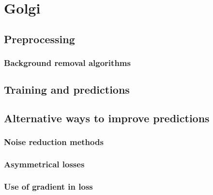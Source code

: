 \section{Golgi}
    \subsection{Preprocessing}
        
        \subsubsection{Background removal algorithms}
        
    \subsection{Training and predictions}
        
        

    \subsection{Alternative ways to improve predictions}
        \subsubsection{Noise reduction methods}
        \subsubsection{Asymmetrical losses}
        \subsubsection{Use of gradient in loss}
